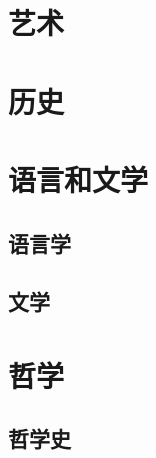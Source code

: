 \documentclass[UTF8]{RepresentationUniverse}
\begin{document}







\chapter{艺术}%

\chapter{历史}%

\chapter{语言和文学}%
    \section{语言学}%
    \section{文学}%




\chapter{哲学}

\section{哲学史}
\end{document}
